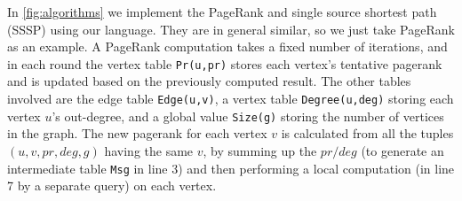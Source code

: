\documentclass{sokendai_thesis} %
\begin{document}
In \autoref{fig:algorithms} we implement the PageRank and single source shortest path (SSSP) using our language.
They are in general similar, so we just take PageRank as an example.
A PageRank computation takes a fixed number of iterations, and in each round the vertex table \texttt{Pr(u,pr)} stores each vertex's tentative pagerank and is updated based on the previously computed result.
The other tables involved are the edge table \texttt{Edge(u,v)}, a vertex table \texttt{Degree(u,deg)} storing each vertex $u$'s out-degree, and a global value \texttt{Size(g)} storing the number of vertices in the graph.
The new pagerank for each vertex $v$ is calculated from all the tuples $(u, v, pr, deg, g)$ having the same $v$, by summing up the $pr / deg$ (to generate an intermediate table \texttt{Msg} in line 3) and then performing a local computation (in line 7 by a separate query) on each vertex.

\end{document}

